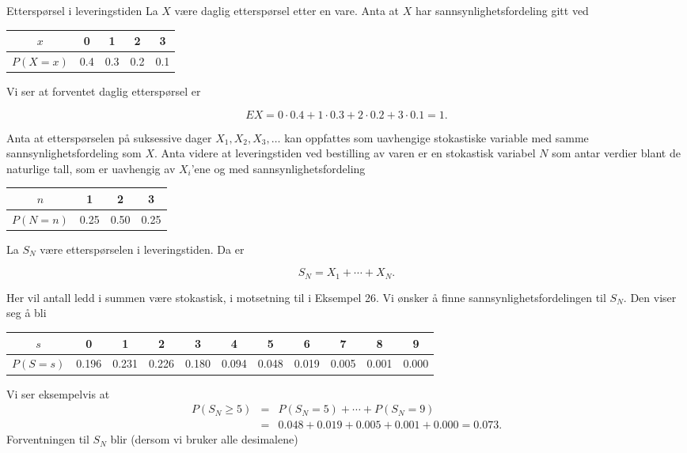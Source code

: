 \begin{eksempel}{Etterspørsel i leveringstiden}
La $X$ være daglig etterspørsel etter en vare. Anta at $X$ har
sannsynlighetsfordeling gitt ved
\begin{center}
 \begin{tabular}{c|cccc}
 $x$& 0  & 1 & 2 & 3 \\ \hline
 $P(X=x)$ & 0.4 & 0.3 & 0.2 & 0.1
\end{tabular}
\end{center}
\noindent Vi ser at forventet daglig etterspørsel er

\[ EX=0\cdot0.4+1\cdot 0.3+2\cdot0.2+3\cdot 0.1=1. \]

\noindent Anta at etterspørselen på suksessive dager
 $X_1, X_2, X_3, \ldots$
kan oppfattes som uavhengige stokastiske variable med samme
sannsynlighetsfordeling som $X$. Anta videre at leveringstiden
ved bestilling av varen er en stokastisk variabel $N$ som antar
verdier blant de naturlige tall, som er uavhengig av $X_i$'ene og
med sannsynlighetsfordeling
\begin{center}
 \begin{tabular}{c|ccc}
 $n$& 1 & 2 & 3 \\ \hline
 $P(N=n)$ & 0.25 & 0.50 & 0.25
\end{tabular}
\end{center}
\noindent La $S_N$ være etterspørselen i leveringstiden. Da er

\[ S_N=X_1+\cdots +X_N . \]

\noindent Her vil antall ledd i summen være stokastisk, i motsetning til i
Eksempel 26. Vi ønsker å finne sannsynlighetsfordelingen til
$S_N$. Den viser seg å bli

\begin{center} \small \addtolength{\tabcolsep}{-0.4\tabcolsep}
 \begin{tabular}{c|cccccccccc}
 $s$& 0  & 1 & 2 & 3 & 4 & 5 & 6 & 7 & 8 & 9 \\ \hline
 $P(S=s)$ &0.196&0.231&0.226&0.180&0.094&0.048&0.019&0.005&0.001&0.000
\end{tabular}
\end{center}
\noindent Vi ser eksempelvis at
\begin{eqnarray*}
P(S_N\geq 5) &=& P(S_N=5) + \cdots + P(S_N=9) \\
             &=&0.048 + 0.019 + 0.005 + 0.001 + 0.000 = 0.073.
\end{eqnarray*}
\noindent Forventningen til $S_N$ blir (dersom vi bruker alle desimalene)


\end{eksempel}
